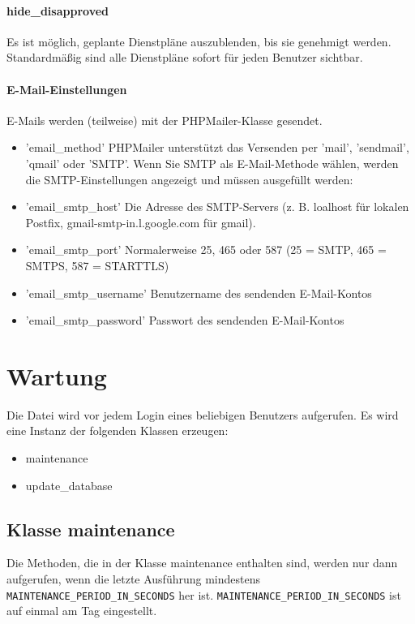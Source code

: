 \paragraph{hide\_disapproved}
Es ist möglich, geplante Dienstpläne auszublenden, bis sie genehmigt
werden. Standardmäßig sind alle Dienstpläne sofort für jeden Benutzer
sichtbar.

\paragraph{E-Mail-Einstellungen} E-Mails werden (teilweise) mit der
PHPMailer-Klasse gesendet.
\begin{itemize}
	\item 'email\_method' PHPMailer unterstützt das Versenden per 'mail', 'sendmail',
'qmail' oder 'SMTP'. Wenn Sie SMTP als E-Mail-Methode wählen, werden die
SMTP-Einstellungen angezeigt und müssen ausgefüllt werden:
	\item 'email\_smtp\_host' Die Adresse des SMTP-Servers (z. B. loalhost für lokalen
Postfix, gmail-smtp-in.l.google.com für gmail).	
	\item 'email\_smtp\_port' Normalerweise 25, 465 oder 587 (25 = SMTP, 465 = SMTPS,
587 = STARTTLS)
	\item 'email\_smtp\_username' Benutzername des sendenden E-Mail-Kontos
	\item 'email\_smtp\_password' Passwort des sendenden E-Mail-Kontos
\end{itemize}



\section{Wartung}
Die Datei   wird vor jedem
Login eines beliebigen Benutzers aufgerufen.  Es wird eine Instanz der
folgenden Klassen erzeugen:
\begin{itemize}
    \item maintenance
    \item update\_database
    \end{itemize}

\subsection{Klasse maintenance}
Die Methoden, die in der Klasse maintenance enthalten sind, werden nur dann
aufgerufen, wenn die letzte Ausführung mindestens
\lstinline|MAINTENANCE_PERIOD_IN_SECONDS| her ist.
\lstinline|MAINTENANCE_PERIOD_IN_SECONDS| ist auf einmal am Tag eingestellt.


